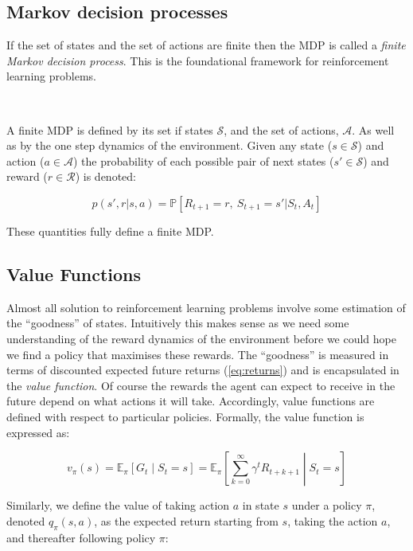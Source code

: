 \documentclass{article}
\begin{document}
\subsection{Markov decision processes}

If the set of states and the set of actions are finite then the MDP is called a \textit{finite Markov decision process}. This is the foundational framework for reinforcement learning problems. 

\

A finite MDP is defined by its set if states $\mathcal{S}$, and the set of actions, $\mathcal{A}$. As well as by the one step dynamics of the environment. Given any state ($s \in \mathcal{S}$) and action ($a \in \mathcal{A}$) the probability of each possible pair of next states ($s' \in \mathcal{S}$) and reward ($r \in \mathcal{R}$) is denoted:

\begin{equation}
	p(s', r | s, a) = \mathbb{P}[ R_{t+1} = r, \ S_{t+1} = s' | S_t, A_t]
\end{equation}

These quantities fully define a finite MDP.

\subsection{Value Functions}

Almost all solution to reinforcement learning problems involve some estimation of the ``goodness'' of states. Intuitively this makes sense as we need some understanding of the reward dynamics of the environment before we could hope we find a policy that maximises these rewards. The ``goodness'' is measured in terms of discounted expected future returns (\ref{eq:returns}) and is encapsulated in the \textit{value function}. Of course the rewards the agent can expect to receive in the future depend on what actions it will take. Accordingly, value functions are defined with respect to particular policies. Formally, the value function is expressed as:

\begin{equation}\label{eq:value_function}
	v_\pi(s) = \mathbb{E}_\pi\left[ G_t \middle| S_t = s \right] = \mathbb{E}_\pi\left[ \sum_{k=0}^\infty \gamma^t R_{t + k + 1} \middle| S_t = s \right]
\end{equation}

Similarly, we define the value of taking action $a$ in state $s$ under a policy $\pi$, denoted $q_\pi(s, a)$, as the expected return starting from $s$, taking the action $a$, and thereafter following policy $\pi$:
\end{document}
